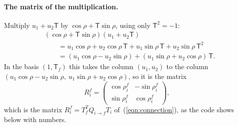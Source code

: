 \paragraph{The matrix of the multiplication.} Multiply $u_1 + u_2\mathsf T$ by $\cos\rho + \mathsf T\sin\rho$, using only $\mathsf T^2 = -1$:
\begin{align*}
&(\cos\rho + \mathsf T\sin\rho)(u_1 + u_2\mathsf T) \\
&\qquad= u_1\cos\rho + u_2\cos\rho\,\mathsf T + u_1\sin\rho\,\mathsf T + u_2\sin\rho\,\mathsf T^2 \\
&\qquad= (u_1\cos\rho - u_2\sin\rho) + (u_1\sin\rho + u_2\cos\rho)\,\mathsf T .
\end{align*}
In the basis $(1, \mathsf T_f)$ this takes the column $(u_1, u_2)$ to the column $(u_1\cos\rho - u_2\sin\rho,\ u_1\sin\rho + u_2\cos\rho)$, so it is the matrix
\begin{equation}
\label{eqn:ga_matrix}
R_i^f = \begin{pmatrix} \cos\rho_i^f & -\sin\rho_i^f \\ \sin\rho_i^f & \cos\rho_i^f \end{pmatrix},
\end{equation}
which is the matrix $R_i^f = T_f^TQ_{i\to f}T_i$ of~(\ref{eqn:connection}), as the code shows below with numbers.


